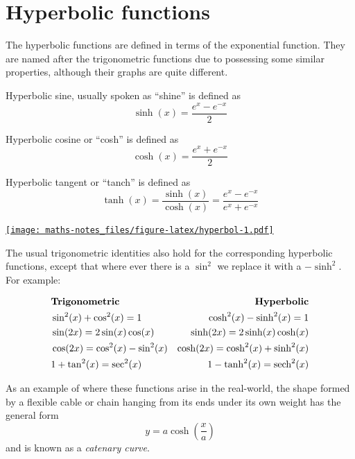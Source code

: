 \documentclass[
]{book}
\theoremstyle{definition}
\theoremstyle{definition}
\theoremstyle{definition}
\theoremstyle{definition}
\theoremstyle{remark}
\begin{document}
\hypertarget{hyperbolic-functions}{%
\section{Hyperbolic functions}\label{hyperbolic-functions}}

The hyperbolic functions are defined in terms of the exponential function. They are named after the trigonometric functions due to possessing some similar properties, although their graphs are quite different.

Hyperbolic sine, usually spoken as ``shine'' is defined as
\[\sinh(x)=\frac{e^x-e^{-x}}{2}\]

Hyperbolic cosine or ``cosh'' is defined as
\[\cosh(x)=\frac{e^x+e^{-x}}{2}\]

Hyperbolic tangent or ``tanch'' is defined as
\[{\tanh(x)=\dfrac{\sinh(x)}{\cosh(x)}=\dfrac{e^x-e^{-x}}{e^x+e^{-x}}}\]

\href{https://www.desmos.com/calculator/xrpc0in171}{\texttt{[image: maths-notes\_files/figure-latex/hyperbol-1.pdf]}}

The usual trigonometric identities also hold for the corresponding hyperbolic functions, except that where ever there is a \(\sin^2\) we replace it with a \(-\sinh^2\). For example:

\begin{align*}
&\text{\textbf{Trigonometric}}  &\text{\textbf{Hyperbolic}}\\
&\sin^2(x)+\cos^2(x)=1          &\cosh^2(x)-\sinh^2(x)=1          \\
&\sin(2x)=2\sin(x)\cos(x)       &\sinh(2x)=2\sinh(x)\cosh(x)       \\
&\cos(2x)=\cos^2(x)-\sin^2(x)   &\cosh(2x)=\cosh^2(x)+\sinh^2(x)   \\
&1+\tan^2(x)=\sec^2(x)          &1-\tanh^2(x)=\text{sech}^2(x)
\end{align*}

As an example of where these functions arise in the real-world, the shape formed by a flexible cable or chain hanging from its ends under its own weight has the general form
\begin{equation*}
y=a\cosh\left(\frac{x}{a}\right)
\end{equation*}
and is known as a \emph{catenary curve}.
\end{document}
